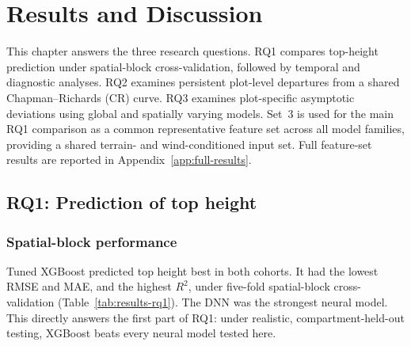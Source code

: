 
\chapter{Results and Discussion}
\label{ch:results}

This chapter answers the three research questions. RQ1 compares top-height prediction under
spatial-block cross-validation, followed by temporal and diagnostic analyses. RQ2 examines
persistent plot-level departures from a shared Chapman--Richards (CR) curve. RQ3 examines
plot-specific asymptotic deviations using global and spatially varying models. Set~3 is used for
the main RQ1 comparison as a common representative feature set across all model families,
providing a shared terrain- and wind-conditioned input set. Full feature-set results are reported
in Appendix~\ref{app:full-results}.



\section{RQ1: Prediction of top height}
\label{sec:results-rq1}

\subsection{Spatial-block performance}

Tuned XGBoost predicted top height best in both cohorts. It had the lowest RMSE and MAE, and the
highest $R^2$, under five-fold spatial-block cross-validation (Table~\ref{tab:results-rq1}). The
DNN was the strongest neural model. This directly answers the first part of RQ1: under realistic,
compartment-held-out testing, XGBoost beats every neural model tested here.


